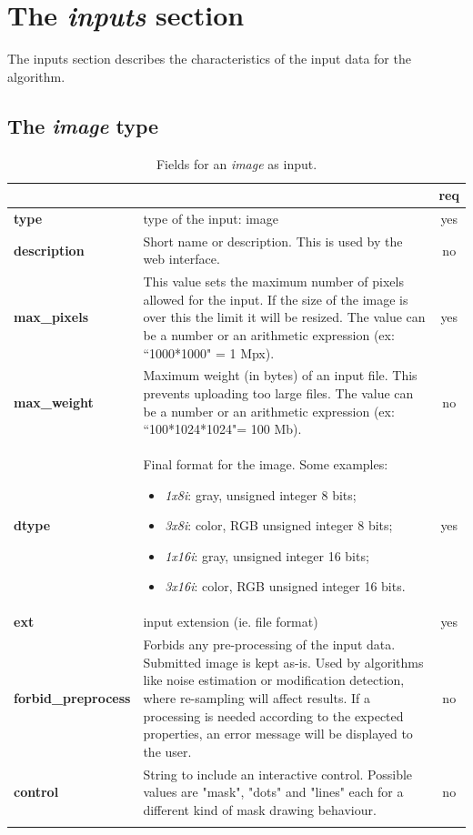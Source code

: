 \section{The \emph{inputs} section}
The inputs section describes the characteristics of the input data for the algorithm.

\subsection{The \emph{image} type}

\begin{longtable}{|>{\bf}L{\linewidth}|L{\linewidth}|c|}
\hline
{}     &  & {\bf req} \tabularnewline 
\hline \hline
 type         & type of the input: image & yes \\ \hline
 description  & Short name or description. This is used by the web interface. & no \\ \hline
 max\_pixels  & This value sets the maximum number of pixels allowed for the input. If the size of the image is over this the limit it will be resized. The value can be a number or an arithmetic expression (ex:  ``1000*1000" = 1 Mpx).  & yes \\ \hline
 max\_weight   & Maximum weight (in bytes) of an input file. This prevents uploading too large files. The value can be a number or an arithmetic expression (ex: ``100*1024*1024"= 100 Mb). & no \\ \hline
 dtype        & Final format for the image. Some examples:
\begin{itemize}
  \setlength\itemsep{-0.5em}
  \item \textit{1x8i}: gray, unsigned integer 8 bits;
  \item \textit{3x8i}: color, RGB unsigned integer 8 bits;
  \item \textit{1x16i}: gray, unsigned integer 16 bits;
  \item \textit{3x16i}: color, RGB unsigned integer 16 bits.
\end{itemize} 
 & yes \\ \hline
 ext          & input extension (ie. file format) & yes \\ \hline
forbid\_preprocess & Forbids any pre-processing of the input data. 
Submitted image is kept as-is. Used by algorithms like noise estimation or modification detection, where re-sampling will affect results. 
If a processing is needed according to the expected properties, an error message will be displayed to the user.
& no \\ \hline
 control & String to include an interactive control. Possible values are "mask", "dots" and "lines" each for a different kind of mask drawing behaviour. & no \\ \hline
\caption{Fields for an \emph{image} as input.}
\end{longtable}

